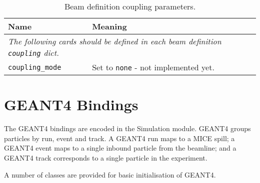 \begin{table*}
\begin{center}
\caption{Beam definition coupling parameters.}
\begin{tabularx}{\linewidth}{lX}
Name & Meaning \\
\hline
\multicolumn{2}{l}{\emph{The following cards should be defined in each beam definition \verb|coupling| dict.}} \\
\hline
\verb|coupling_mode| & Set to \verb|none| - not implemented yet. \\
\end{tabularx}
\end{center}
\end{table*}

\section{GEANT4 Bindings}
The GEANT4 bindings are encoded in the Simulation module. GEANT4 groups particles by run, event and track. A GEANT4 run maps to a MICE spill; a GEANT4 event maps to a single inbound particle from the beamline; and a GEANT4 track corresponds to a single particle in the experiment.

A number of classes are provided for basic initialisation of GEANT4.


